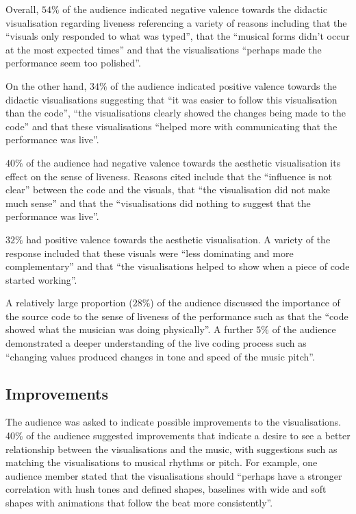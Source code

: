 Overall, $54\%$ of the audience indicated negative valence towards the didactic visualisation regarding liveness referencing a variety of reasons including that the ``visuals only responded to what was typed'', that the ``musical forms didn't occur at the most expected times'' and that the visualisations ``perhaps made the performance seem too polished''.

On the other hand, $34\%$ of the audience indicated positive valence towards the didactic visualisations suggesting that ``it was easier to follow this visualisation than the code'', ``the visualisations clearly showed the changes being made to the code'' and that these visualisations ``helped more with communicating that the performance was live''.

$40\%$ of the audience had negative valence towards the aesthetic visualisation its effect on the sense of liveness. Reasons cited include that the ``influence is not clear'' between the code and the visuals, that ``the visualisation did not make much sense'' and that the ``visualisations did nothing to suggest that the performance was live''.

$32\%$ had positive valence towards the aesthetic visualisation. A variety of the response included that these visuals were ``less dominating and more complementary'' and that ``the visualisations helped to show when a piece of code started working''.

A relatively large proportion ($28\%$) of the audience discussed the importance of the source code to the sense of liveness of the performance such as that the ``code showed what the musician was doing physically''. A further $5\%$ of the audience demonstrated a deeper understanding of the live coding process such as ``changing values produced changes in tone and speed of the music pitch''.

\subsection{Improvements}

The audience was asked to indicate possible improvements to the visualisations. 40\% of the audience suggested improvements that indicate a desire to see a better relationship between the visualisations and the music, with suggestions such as matching the visualisations to musical rhythms or pitch. For example, one audience member stated that the visualisations should ``perhaps have a stronger correlation with hush tones and defined shapes, baselines with wide and soft shapes with animations that follow the beat more consistently''.

